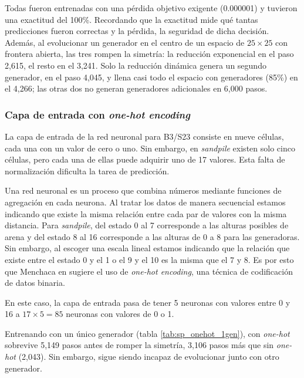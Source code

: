 Todas fueron entrenadas con una pérdida objetivo exigente (0.000001) y tuvieron una exactitud del 100\%. Recordando que la exactitud mide qué tantas predicciones fueron correctas y la pérdida, la seguridad de dicha decisión. Además, al evolucionar un generador en el centro de un espacio de $25 \times 25$ con frontera abierta, las tres rompen la simetría: la reducción exponencial en el paso 2,615, el resto en el 3,241. Solo la reducción dinámica genera un segundo generador, en el paso 4,045, y llena casi todo el espacio con generadores (85\%) en el 4,266; las otras dos no generan generadores adicionales en 6,000 pasos.

\subsubsection{Capa de entrada con \textit{one-hot encoding}}

La capa de entrada de la red neuronal para B3/S23 consiste en nueve células, cada una con un valor de cero o uno. Sin embargo, en \textit{sandpile} existen solo cinco células, pero cada una de ellas puede adquirir uno de 17 valores. Esta falta de normalización dificulta la tarea de predicción. 

Una red neuronal es un proceso que combina números mediante funciones de agregación en cada neurona. Al tratar los datos de manera secuencial estamos indicando que existe la misma relación entre cada par de valores con la misma distancia. Para \textit{sandpile}, del estado 0 al 7 corresponde a las alturas posibles de arena y del estado 8 al 16 corresponde a las alturas de 0 a 8 para las generadoras. Sin embargo, al escoger una escala lineal estamos indicando que la relación que existe entre el estado 0 y el 1 o el 9 y el 10 es la misma que el 7 y 8. Es por esto que Menchaca en \cite{MenchacaMendez2022} sugiere el uso de \textit{one-hot encoding}, una técnica de codificación de datos binaria.

En este caso, la capa de entrada pasa de tener 5 neuronas con valores entre 0 y 16 a $17 \times 5 = 85$ neuronas con valores de 0 o 1.

Entrenando con un único generador (tabla \ref{tab:sp_onehot_1gen}), con \textit{one-hot} sobrevive 5,149 pasos antes de romper la simetría, 3,106 pasos más que sin \textit{one-hot} (2,043). Sin embargo, sigue siendo incapaz de evolucionar junto con otro generador.

